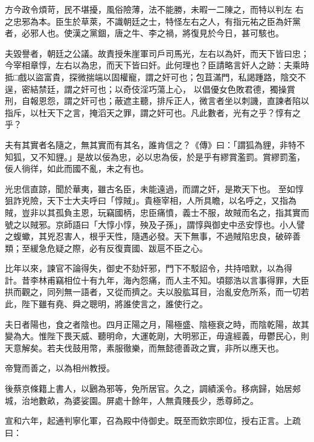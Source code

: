 \begin{pinyinscope}
 方今政令煩苛，民不堪擾，風俗險薄，法不能勝，未暇一二陳之，而特以判左
 右之忠邪為本。臣生於草萊，不識朝廷之士，特怪左右之人，有指元祐之臣為奸黨者，必邪人也。使漢之黨錮，唐之牛、李之禍，將復見於今日，甚可駭也。



 夫毀譽者，朝廷之公議。故責授朱崖軍司戶司馬光，左右以為奸，而天下皆曰忠；今宰相章惇，左右以為忠，而天下皆曰奸。此何理也？臣請略言奸人之跡：夫乘時抵□戲以盜富貴，探微揣端以固權寵，謂之奸可也；包苴滿門，私謁踵路，陰交不逞，密結禁廷，謂之奸可也；以奇伎淫巧蕩上心，
 以倡優女色敗君德，獨操賞刑，自報恩怨，謂之奸可也；蔽遮主聽，排斥正人，微言者坐以刺譏，直諫者陷以指斥，以杜天下之言，掩滔天之罪，謂之奸可也。凡此數者，光有之乎？惇有之乎？



 夫有其實者名隨之，無其實而有其名，誰肯信之？《傳》曰：「謂狐為貍，非特不知狐，又不知貍。」是故以佞為忠，必以忠為佞，於是乎有繆賞濫罰。賞繆罰濫，佞人徜徉，如此而國不亂，未之有也。



 光忠信直諒，聞於華夷，雖古名臣，未能遠過，而謂之奸，是欺天下也。
 至如惇狙詐兇險，天下士大夫呼曰「惇賊」。貴極宰相，人所具瞻，以名呼之，又指為賊，豈非以其孤負主恩，玩竊國柄，忠臣痛憤，義士不服，故賊而名之，指其實而號之以賊邪。京師語曰「大惇小惇，殃及子孫」，謂惇與御史中丞安惇也。小人譬之蝮蠍，其兇忍害人，根乎天性，隨遇必發。天下無事，不過賊陷忠良，破碎善類；至緩急危疑之際，必有反復賣國、跋扈不臣之心。



 比年以來，諫官不論得失，御史不劾奸邪，門下不駁詔令，共持喑默，以為得
 計。昔李林甫竊相位十有九年，海內怨痛，而人主不知。頃鄒浩以言事得罪，大臣拱而觀之，同列無一語者，又從而擠之。夫以股肱耳目，治亂安危所系，而一切若此，陛下雖有堯、舜之聰明，將誰使言之，誰使行之。



 夫日者陽也，食之者陰也。四月正陽之月，陽極盛、陰極衰之時，而陰乾陽，故其變為大。惟陛下畏天威、聽明命，大運乾剛，大明邪正，毋違經義，毋鬱民心，則天意解矣。若夫伐鼓用幣，素服徹樂，而無懿德善政之實，非所以應天也。



 帝覽而善之，以為相州教授。



 後蔡京條籍上書人，以鶠為邪等，免所居官。久之，調績溪令。移病歸，始居郟城，治地數畝，為婆娑園。屏處十餘年，人無貴賤長少，悉尊師之。



 宣和六年，起通判寧化軍，召為殿中侍御史。既至而欽宗即位，授右正言。上疏曰：




\end{pinyinscope}
